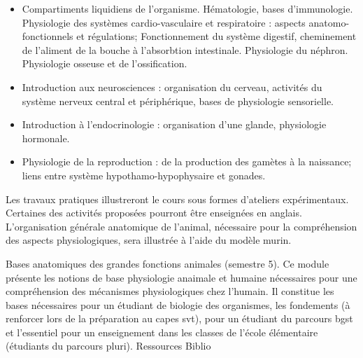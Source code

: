 \documentclass[10pt, a5paper]{report}
\begin{document}
{
\begin{itemize}
\item Compartiments liquidiens de l'organisme. Hématologie, bases d'immunologie. Physiologie des systèmes cardio-vasculaire et respiratoire : aspects anatomo-fonctionnels et régulations; Fonctionnement du système digestif, cheminement de l'aliment de la bouche à l'absorbtion intestinale. Physiologie du néphron. Physiologie osseuse et de l'ossification. 
\item Introduction aux neurosciences : organisation du cerveau, activités du système nerveux central et périphérique, bases de physiologie sensorielle.
\item Introduction à l'endocrinologie : organisation d'une glande, physiologie hormonale. 
\item Physiologie de la reproduction : de la production des gamètes à la naissance; liens entre système hypothamo-hypophysaire et gonades.
\end{itemize}
Les travaux pratiques illustreront le cours sous formes d'ateliers expérimentaux. Certaines des activités proposées pourront être enseignées en anglais.
L'organisation générale anatomique de l'animal, nécessaire pour la compréhension des aspects physiologiques, sera illustrée à l'aide du modèle murin.}
{Bases anatomiques des grandes fonctions animales (semestre 5).}
{Ce module présente les notions de base physiologie anaimale et humaine nécessaires pour une compréhension des mécanismes physiologiques chez l'humain. Il constitue les bases nécessaires pour un étudiant de biologie des organismes, les fondements (à renforcer lors de la préparation au {\sc capes svt}), pour un étudiant du parcours {\sc bgst} et l'essentiel pour un enseignement dans les classes de l'école élémentaire (étudiants du parcours pluri).}
{Ressources} 
{Biblio} 
 
\end{document}
